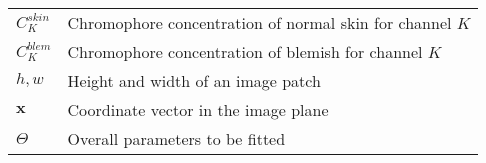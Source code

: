 \begin{spacing}{1.5}
\begin{table}[ht]
\begin{tabular}{ll}
\textbf{$C_K^{skin}$} & Chromophore concentration of normal skin for channel $K$ \\
\textbf{$C_K^{blem}$} & Chromophore concentration of blemish for channel $K$ \\
\textbf{$h, w$} & Height and width of an image patch \\
\textbf{$\mathbf{x}$} & Coordinate vector in the image plane \\
\textbf{$\Theta$} & Overall parameters to be fitted \\
\end{tabular}%
\end{table}
\end{spacing}
\newpage
